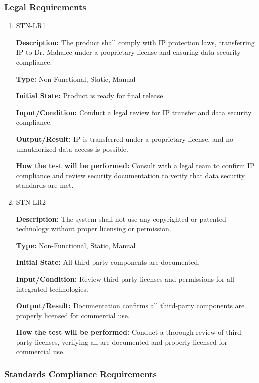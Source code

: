 \documentclass[12pt, titlepage]{article}
\begin{document}
\subsubsection{Legal Requirements}

\begin{enumerate}

\item{STN-LR1\\}

\textbf{Description:} The product shall comply with IP protection laws, transferring IP to Dr. Mahalec under a proprietary license and ensuring data security compliance.

\textbf{Type:} Non-Functional, Static, Manual

\textbf{Initial State:} Product is ready for final release.

\textbf{Input/Condition:} Conduct a legal review for IP transfer and data security compliance.

\textbf{Output/Result:} IP is transferred under a proprietary license, and no unauthorized data access is possible.

\textbf{How the test will be performed:} Consult with a legal team to confirm IP compliance and review security documentation to verify that data security standards are met.

\item{STN-LR2\\}

\textbf{Description:} The system shall not use any copyrighted or patented technology without proper licensing or permission.

\textbf{Type:} Non-Functional, Static, Manual

\textbf{Initial State:} All third-party components are documented.

\textbf{Input/Condition:} Review third-party licenses and permissions for all integrated technologies.

\textbf{Output/Result:} Documentation confirms all third-party components are properly licensed for commercial use.

\textbf{How the test will be performed:} Conduct a thorough review of third-party licenses, verifying all are documented and properly licensed for commercial use.

\end{enumerate}

\subsubsection{Standards Compliance Requirements}
\end{document}
